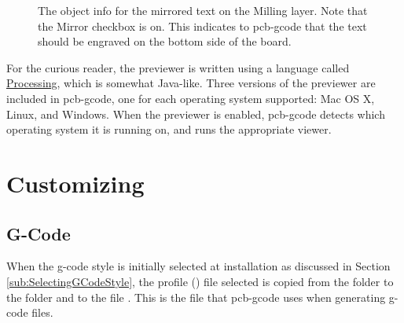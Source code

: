 \documentclass[11pt]{book}
\begin{document}
\begin{figure}
	\caption{The object info for the mirrored text on the Milling layer. Note that the Mirror checkbox is on. This indicates to pcb-gcode that the text should be engraved on the bottom side of the board.}
	\label{fig:MirroredTextInfo}
\end{figure}


\howitworks{}
For the curious reader, the previewer is written using a language called \href{http://processing.org}{Processing}, which is somewhat Java-like. Three versions of the previewer are included in pcb-gcode, one for each operating system supported: Mac OS X, Linux, and Windows. When the previewer is enabled, pcb-gcode detects which operating system it is running on, and runs the appropriate viewer.

%
\chapter{Customizing}
%

%
%
\section{G-Code}\label{sec:CustomizingGCode}

When the g-code style is initially selected at installation as discussed in Section \vref{sub:SelectingGCodeStyle}, the profile () file selected is copied from the  folder to the  folder and to the file . This is the file that pcb-gcode uses when generating g-code files.
\end{document}
